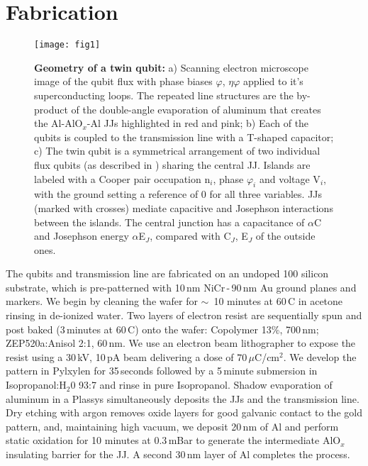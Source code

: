 \section{Fabrication}


\begin{figure}[h]
  \texttt{[image: fig1]}
  \caption{\small \textbf{Geometry of a twin qubit:}  a) Scanning electron microscope image of
    the qubit flux with phase biases $ \varphi $,  $ \eta\varphi $ applied to it's superconducting loops. The
    repeated line  structures are the by-product  of the double-angle evaporation  of aluminum
    that creates the Al-AlO$_x$-Al  JJs highlighted in red and pink; b) Each  of the qubits is
    coupled  to the  transmission line  with a  T-shaped  capacitor; c)  The twin  qubit is  a
    symmetrical arrangement of two individual flux qubits (as described in \cite{orlando1999})
    sharing the central  JJ.  Islands are labeled  with a Cooper pair  occupation n$_i$, phase
    $\varphi_i$ and voltage V$_i$, with the ground setting a reference of 0 for all three variables.
    JJs  (marked with  crosses)  mediate  capacitive and  Josephson  interactions between  the
    islands.   The  central   junction  has  a  capacitance  of  $\alpha$C   and  Josephson  energy
    $ \alpha$E$_{J}$, compared with C$_J$, E$_J$ of the outside ones.}
  \label{fig:setup}
\end{figure}

\noindent The qubits and transmission line are fabricated on an undoped 100 silicon substrate,
which is pre-patterned with  10\,nm NiCr\,-\,90\,nm Au ground planes and  markers. We begin by
cleaning the wafer  for $\sim$~10 minutes at  60\,C in acetone rinsing in  de-ionized water.  Two
layers of electron resist are sequentially spun  and post baked (3\,minutes at 60\,C) onto the
wafer:  {Copolymer 13\%},  700\,nm;  ZEP520a:Anisol  2:1, 60\,nm.   We  use  an electron  beam
lithographer  to  expose  the  resist  using  a 30\,kV,  10\,pA  beam  delivering  a  dose  of
$ 70\,\mu $C/cm$^2$.  We develop the pattern in Pylxylen for 35\,seconds followed by a 5\,minute
submersion in  Isopropanol:H$_2$0 93:7 and rinse  in pure Isopropanol.  Shadow  evaporation of
aluminum in a Plassys \cite{wu2013} simultaneously deposits the JJs and the transmission line.
Dry etching  with argon removes oxide  layers for good  galvanic contact to the  gold pattern,
and, maintaining  high vacuum, we  deposit 20\,nm  of Al and  perform static oxidation  for 10
minutes at 0.3\,mBar  to generate the intermediate  AlO$_x$ insulating barrier for  the JJ.  A
second 30\,nm layer of Al completes the process.

